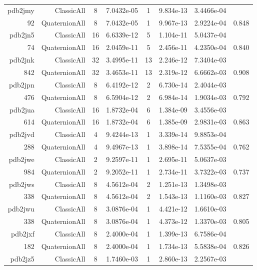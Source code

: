 \begin{xltabular}{\textwidth}{r|rcS[table-format=1.4e+2]cS[table-format=1.3e+2]S[table-format=1.4e+2]S[table-format=-1.3]}
pdb2jmy & ClassicAll & 8 & 7.0432e-05 & 1 & 9.834e-13 & 3.4466e-04 & \\
92 & QuaternionAll & 8 & 7.0432e-05 & 1 & 9.967e-13 & 2.9224e-04 & 0.848\\  \addlinespace
pdb2jn5 & ClassicAll & 16 & 6.6339e-12 & 5 & 1.104e-11 & 5.0437e-04 & \\
74 & QuaternionAll & 16 & 2.0459e-11 & 5 & 2.456e-11 & 4.2350e-04 & 0.840\\  \addlinespace
pdb2jnk & ClassicAll & 32 & 3.4995e-11 & 13 & 2.246e-12 & 7.3404e-03 & \\
842 & QuaternionAll & 32 & 3.4653e-11 & 13 & 2.319e-12 & 6.6662e-03 & 0.908\\  \addlinespace
pdb2jpn & ClassicAll & 8 & 6.4192e-12 & 2 & 6.730e-14 & 2.4044e-03 & \\
476 & QuaternionAll & 8 & 6.5904e-12 & 2 & 6.984e-14 & 1.9034e-03 & 0.792\\  \addlinespace
pdb2jua & ClassicAll & 16 & 1.8732e-04 & 6 & 1.384e-09 & 3.4556e-03 & \\
614 & QuaternionAll & 16 & 1.8732e-04 & 6 & 1.385e-09 & 2.9831e-03 & 0.863\\  \addlinespace
pdb2jvd & ClassicAll & 4 & 9.4244e-13 & 1 & 3.339e-14 & 9.8853e-04 & \\
288 & QuaternionAll & 4 & 9.4967e-13 & 1 & 3.898e-14 & 7.5355e-04 & 0.762\\  \addlinespace
pdb2jwe & ClassicAll & 2 & 9.2597e-11 & 1 & 2.695e-11 & 5.0637e-03 & \\
984 & QuaternionAll & 2 & 9.2052e-11 & 1 & 2.734e-11 & 3.7322e-03 & 0.737\\  \addlinespace
pdb2jws & ClassicAll & 8 & 4.5612e-04 & 2 & 1.251e-13 & 1.3498e-03 & \\
338 & QuaternionAll & 8 & 4.5612e-04 & 2 & 1.543e-13 & 1.1160e-03 & 0.827\\  \addlinespace
pdb2jwu & ClassicAll & 8 & 3.0876e-04 & 1 & 4.421e-12 & 1.6610e-03 & \\
338 & QuaternionAll & 8 & 3.0876e-04 & 1 & 4.373e-12 & 1.3370e-03 & 0.805\\  \addlinespace
pdb2jxf & ClassicAll & 8 & 2.4000e-04 & 1 & 1.399e-13 & 6.7586e-04 & \\
182 & QuaternionAll & 8 & 2.4000e-04 & 1 & 1.734e-13 & 5.5838e-04 & 0.826\\  \addlinespace
pdb2jz5 & ClassicAll & 8 & 1.7460e-03 & 1 & 2.860e-13 & 2.2567e-03 & \\

\end{xltabular}
